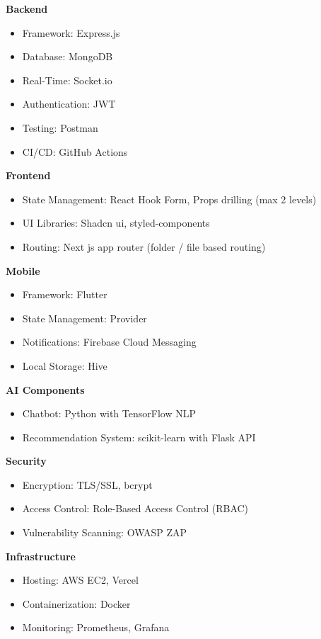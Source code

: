 \textbf{Backend}
\begin{itemize}
    \item Framework: Express.js
    \item Database: MongoDB
    \item Real-Time: Socket.io
    \item Authentication: JWT
    \item Testing: Postman
    \item CI/CD: GitHub Actions
\end{itemize}

\textbf{Frontend}
\begin{itemize}
    \item State Management: React Hook Form, Props drilling (max 2 levels)
    \item UI Libraries: Shadcn ui, styled-components
    \item Routing: Next js app router (folder / file based routing)
\end{itemize}

\textbf{Mobile}
\begin{itemize}
    \item Framework: Flutter
    \item State Management: Provider
    \item Notifications: Firebase Cloud Messaging
    \item Local Storage: Hive
\end{itemize}

\textbf{AI Components}
\begin{itemize}
    \item Chatbot: Python with TensorFlow NLP
    \item Recommendation System: scikit-learn with Flask API
\end{itemize}

\textbf{Security}
\begin{itemize}
    \item Encryption: TLS/SSL, bcrypt
    \item Access Control: Role-Based Access Control (RBAC)
    \item Vulnerability Scanning: OWASP ZAP
\end{itemize}

\textbf{Infrastructure}
\begin{itemize}
    \item Hosting: AWS EC2, Vercel
    \item Containerization: Docker
    \item Monitoring: Prometheus, Grafana
\end{itemize}

